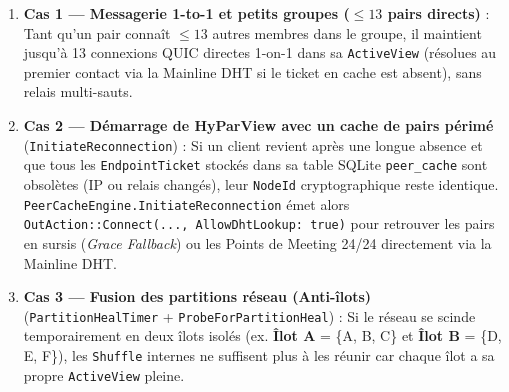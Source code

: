 \documentclass[11pt,a4paper]{article}
\begin{document}
\begin{enumerate}
    \item \textbf{Cas 1 — Messagerie 1-to-1 et petits groupes ($\le 13$ pairs directs)} :
    Tant qu'un pair connaît $\le 13$ autres membres dans le groupe, il maintient jusqu'à 13 connexions QUIC directes 1-on-1 dans sa \texttt{ActiveView} (résolues au premier contact via la Mainline DHT si le ticket en cache est absent), sans relais multi-sauts.

    \item \textbf{Cas 2 — Démarrage de HyParView avec un cache de pairs périmé} (\texttt{InitiateReconnection}) :
    Si un client revient après une longue absence et que tous les \texttt{EndpointTicket} stockés dans sa table SQLite \texttt{peer\_cache} sont obsolètes (IP ou relais changés), leur \texttt{NodeId} cryptographique reste identique. \texttt{PeerCacheEngine.InitiateReconnection} émet alors \texttt{OutAction::Connect(..., AllowDhtLookup: true)} pour retrouver les pairs en sursis (\emph{Grace Fallback}) ou les Points de Meeting 24/24 directement via la Mainline DHT.

    \item \textbf{Cas 3 — Fusion des partitions réseau (Anti-îlots)} (\texttt{PartitionHealTimer} + \texttt{ProbeForPartitionHeal}) :
    Si le réseau se scinde temporairement en deux îlots isolés (ex. \textbf{Îlot A} = \{A, B, C\} et \textbf{Îlot B} = \{D, E, F\}), les \texttt{Shuffle} internes ne suffisent plus à les réunir car chaque îlot a sa propre \texttt{ActiveView} pleine.
\end{enumerate}

\begin{center}
\end{center}
\end{document}
